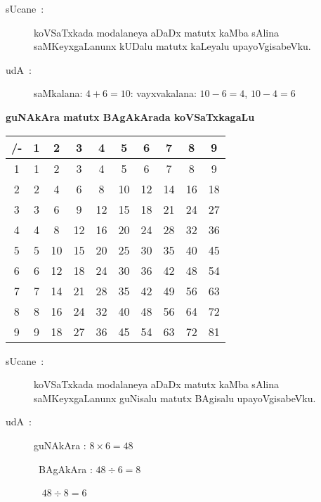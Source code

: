 \medskip
\begin{center}
\begin{minipage}[c]{10cm}
\begin{description}
\item[sUcane~:] koVSaTxkada modalaneya aDaDx matutx kaMba sAlina saMKeyxgaLanunx kUDalu matutx kaLeyalu upayoVgisabeVku.

\item[udA~:] saMkalana: $4+6=10$: vayxvakalana: $10-6=4$, $10-4=6$
\end{description}
\end{minipage}
\end{center}

\bigskip

\begin{center}
{\large\bf guNAkAra matutx BAgAkArada koVSaTxkagaLu}

\smallskip
{\large\bf  {}}
\end{center}

\smallskip
\begin{center}
\renewcommand{\arraystretch}{1.25}
\begin{tabular}{|>{\rm}c<{\rm}|>{\rm}c<{\rm}|>{\rm}c<{\rm}|>{\rm}c<{\rm}|>{\rm}c<{\rm}|>{\rm}c<{\rm}|>{\rm}c<{\rm}|>{\rm}c<{\rm}|>{\rm}c<{\rm}|>{\rm}c<{\rm}|}
\hline
/- & 1 & 2 & 3 & 4 & 5 & 6 & 7 & 8 & 9\\
\hline
1 & 1 & 2 & 3 & 4 & 5 & 6 & 7 & 8 & 9\\
\hline
2 & 2 & 4 & 6 & 8 & 10 & 12 & 14 & 16 & 18\\
\hline
3 & 3 & 6 & 9 & 12 & 15 & 18 & 21 & 24 & 27\\
\hline
4 & 4 & 8 & 12 & 16 & 20 & 24 & 28 & 32 & 36\\
\hline
5 & 5 & 10 & 15 & 20 & 25 & 30 & 35 & 40 & 45\\
\hline
6 & 6 & 12 & 18 & 24 & 30 & 36 & 42 & 48 & 54\\
\hline
7 & 7 & 14 & 21 & 28 & 35 & 42 & 49 & 56 & 63\\
\hline
8 & 8 & 16 & 24 & 32 & 40 & 48 & 56 & 64 & 72\\
\hline
9 & 9 & 18 & 27 & 36 & 45 & 54 & 63 & 72 & 81\\
\hline
\end{tabular}
\end{center}

\medskip
\begin{center}
\begin{minipage}[c]{10cm}
\begin{description}
\item[sUcane~:] koVSaTxkada modalaneya aDaDx matutx kaMba sAlina saMKeyxgaLanunx guNisalu matutx BAgisalu upayoVgisabeVku.

\item[udA~:] guNAkAra : $8\times 6=48$ 

~BAgAkAra : $48\div 6 = 8$

~\phantom{iAAAAA} $48\div 8 = 6$
\end{description}
\end{minipage}
\end{center}


